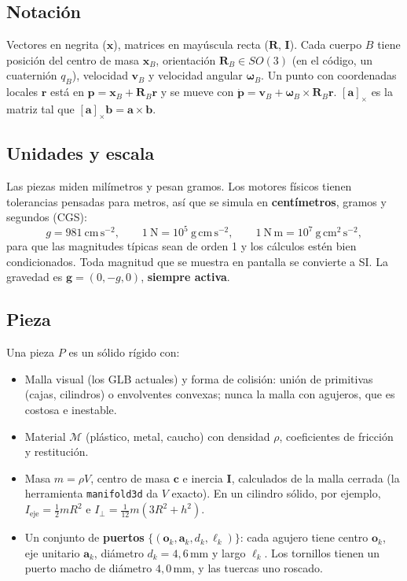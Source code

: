 \documentclass[11pt,a4paper]{article}
\numberwithin{equation}{section}
\newcommand{\vect}[1]{\bm{#1}}
\newcommand{\R}{\mathbf{R}}
\newcommand{\I}{\mathbf{I}}
\newcommand{\skw}[1]{[\vect{#1}]_\times}
\begin{document}
\subsection{Notación}
Vectores en negrita ($\vect{x}$), matrices en mayúscula recta ($\R$, $\I$). Cada cuerpo $B$ tiene posición del centro
de masa $\vect{x}_B$, orientación $\R_B\in SO(3)$ (en el código, un cuaternión $q_B$), velocidad $\vect{v}_B$ y
velocidad angular $\vect{\omega}_B$. Un punto con coordenadas locales $\vect{r}$ está en
$\vect{p} = \vect{x}_B + \R_B\vect{r}$ y se mueve con $\dot{\vect{p}} = \vect{v}_B + \vect{\omega}_B\times\R_B\vect{r}$.
$\skw{a}$ es la matriz tal que $\skw{a}\vect{b} = \vect{a}\times\vect{b}$.

\subsection{Unidades y escala}
Las piezas miden milímetros y pesan gramos. Los motores físicos tienen tolerancias pensadas para metros, así que se
simula en \textbf{centímetros}, gramos y segundos (CGS):
\begin{equation}
  g = 981\ \mathrm{cm\,s^{-2}},\qquad 1\ \mathrm{N} = 10^{5}\ \mathrm{g\,cm\,s^{-2}},\qquad
  1\ \mathrm{N\,m} = 10^{7}\ \mathrm{g\,cm^{2}\,s^{-2}},
\end{equation}
para que las magnitudes típicas sean de orden 1 y los cálculos estén bien condicionados. Toda magnitud que se
muestra en pantalla se convierte a SI.
La gravedad es $\vect{g} = (0,-g,0)$, \textbf{siempre activa}.

\subsection{Pieza}\label{sec:piezas}
Una pieza $P$ es un sólido rígido con:
\begin{itemize}[leftmargin=*]
  \item Malla visual (los GLB actuales) y forma de colisión: unión de primitivas (cajas, cilindros) o envolventes
        convexas; nunca la malla con agujeros, que es costosa e inestable.
  \item Material $\mathcal{M}$ (plástico, metal, caucho) con densidad $\rho$, coeficientes de fricción y restitución.
  \item Masa $m = \rho V$, centro de masa $\vect{c}$ e inercia $\I$, calculados de la malla cerrada (la herramienta
        \texttt{manifold3d} da $V$ exacto). En un cilindro sólido, por ejemplo,
        $I_{\text{eje}} = \tfrac12 m R^2$ e $I_{\perp} = \tfrac1{12} m(3R^2 + h^2)$.
  \item Un conjunto de \textbf{puertos} $\{(\vect{o}_k, \vect{a}_k, d_k, \ell_k)\}$: cada agujero tiene centro
        $\vect{o}_k$, eje unitario $\vect{a}_k$, diámetro $d_k = 4{,}6$\,mm y largo $\ell_k$. Los tornillos tienen un
        puerto macho de diámetro $4{,}0$\,mm, y las tuercas uno roscado.
\end{itemize}
\end{document}
